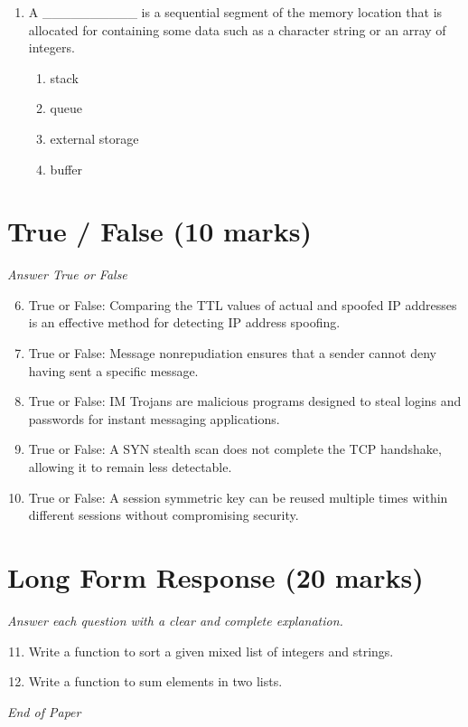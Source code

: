 \documentclass[12pt]{article}
\begin{document}
\begin{enumerate}[label=\arabic*.]
\begin{enumerate}[label=(\alph*)]
    \item Determine who the user is
\end{enumerate}
\item A \_\_\_\_\_\_\_\_\_\_ is a sequential segment of the memory location that is allocated for containing some data such as a character string or an array of integers.
\begin{enumerate}[label=(\alph*)]
    \item stack
    \item queue
    \item external storage
    \item buffer
\end{enumerate}
\end{enumerate}

\section*{True / False (10 marks)}
\textit{Answer True or False}
\begin{enumerate}[label=\arabic*.]
\setcounter{enumi}{5}
\item True or False: Comparing the TTL values of actual and spoofed IP addresses is an effective method for detecting IP address spoofing.
\item True or False: Message nonrepudiation ensures that a sender cannot deny having sent a specific message.
\item True or False: IM Trojans are malicious programs designed to steal logins and passwords for instant messaging applications.
\item True or False: A SYN stealth scan does not complete the TCP handshake, allowing it to remain less detectable.
\item True or False: A session symmetric key can be reused multiple times within different sessions without compromising security.
\end{enumerate}

\section*{Long Form Response (20 marks)}
\textit{Answer each question with a clear and complete explanation.}
\begin{enumerate}[label=\arabic*.]
\setcounter{enumi}{10}
\item Write a function to sort a given mixed list of integers and strings.
\item Write a function to sum elements in two lists.
\end{enumerate}

\vfill
\noindent\textit{End of Paper}
\end{document}
